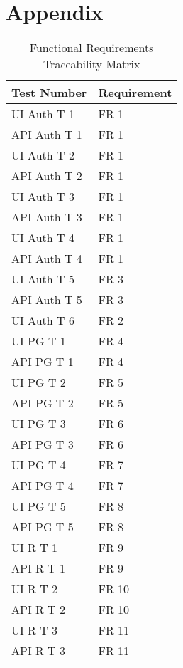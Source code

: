 \documentclass[12pt, titlepage]{article}
\begin{document}
\section*{Appendix}
\begin{table}[H]
	\caption{Functional Requirements Traceability Matrix} \label{TraceMatrix1}
	\begin{tabular}{ll}
		\toprule
		\textbf{Test Number} & \textbf{Requirement} \\
		\midrule
		UI Auth T 1 & FR 1\\
		API Auth T 1 & FR 1\\
		UI Auth T 2 & FR 1\\
		API Auth T 2 & FR 1\\
		UI Auth T 3 & FR 1\\
		API Auth T 3 & FR 1\\
		UI Auth T 4 & FR 1\\
		API Auth T 4 & FR 1\\
		UI Auth T 5 & FR 3\\
		API Auth T 5 & FR 3\\
		UI Auth T 6 & FR 2\\
		\midrule
		UI PG T 1 & FR 4\\
		API PG T 1 & FR 4\\
		UI PG T 2 & FR 5\\
		API PG T 2 & FR 5\\
		UI PG T 3 & FR 6\\
		API PG T 3 & FR 6\\
		UI PG T 4 & FR 7\\
		API PG T 4 & FR 7\\
		UI PG T 5 & FR 8\\
		API PG T 5 & FR 8\\
		\midrule
		UI R T 1 & FR 9\\
		API R T 1 & FR 9\\
		UI R T 2 & FR 10\\
		API R T 2 & FR 10\\
		UI R T 3 & FR 11\\
		API R T 3 & FR 11\\
		\bottomrule
	\end{tabular}
\end{table}
\end{document}
